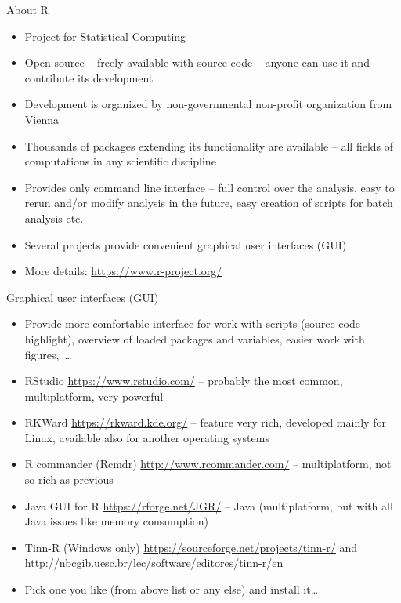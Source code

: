 \documentclass[compress, ucs, xelatex, 11pt, xcolor=svgnames,
  hyperref={
    bookmarks=true,
    unicode=true,
    colorlinks=true,
    pdftitle={Molecular data in R},
    plainpages=false,
    pdfauthor={Vojtech Zeisek},
    pdfsubject={Course about phylogeny and evolution in R},
    pdfcreator={XeLaTeX},
    pdfkeywords={R, evolution, phylogeny, molecular data},
    linkcolor=Tomato,
    anchorcolor=SaddleBrown,
    citecolor=Goldenrod,
    filecolor=DarkMagenta,
    menucolor=Sienna,
    urlcolor=DarkTurquoise,
    pdftex},
  url={hyphens, lowtilde} %
  ]{beamer}
\begin{document}
\begin{frame}{About R}
  \begin{itemize}
    \item Project for Statistical Computing
    \item Open-source -- freely available with source code -- anyone can use it and contribute its development
    \item Development is organized by non-governmental non-profit organization from Vienna
    \item Thousands of packages extending its functionality are available -- all fields of computations in any scientific discipline
    \item Provides only command line interface -- full control over the analysis, easy to rerun and/or modify analysis in the future, easy creation of scripts for batch analysis etc.
    \item Several projects provide convenient graphical user interfaces (GUI)
    \item More details: \url{https://www.r-project.org/}
  \end{itemize}
\end{frame}

\begin{frame}{Graphical user interfaces (GUI)}
  \begin{itemize}
    \item Provide more comfortable interface for work with scripts (source code highlight), overview of loaded packages and variables, easier work with figures,~\ldots
    \item RStudio \url{https://www.rstudio.com/} -- probably the most common, multiplatform, very powerful
    \item RKWard \url{https://rkward.kde.org/} -- feature very rich, developed mainly for Linux, available also for another operating systems
    \item R commander (Rcmdr) \url{http://www.rcommander.com/} -- multiplatform, not so rich as previous
    \item Java GUI for R \url{https://rforge.net/JGR/} -- Java (multiplatform, but with all Java issues like memory consumption)
    \item Tinn-R (Windows only) \url{https://sourceforge.net/projects/tinn-r/} and \url{http://nbcgib.uesc.br/lec/software/editores/tinn-r/en}
    \item Pick one you like (from above list or any else) and install it\ldots
  \end{itemize}
\end{frame}
\end{document}

